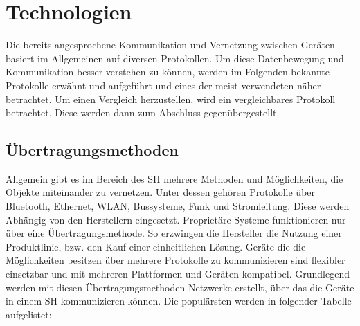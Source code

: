 \section{Technologien}
\label{sec:technologien}
    Die bereits angesprochene Kommunikation und Vernetzung zwischen Geräten basiert im Allgemeinen auf 
    diversen Protokollen. Um diese Datenbewegung und Kommunikation besser verstehen zu können, werden im 
    Folgenden bekannte Protokolle erwähnt und aufgeführt und eines der meist verwendeten näher betrachtet. 
    Um einen Vergleich herzustellen, wird ein vergleichbares Protokoll betrachtet. Diese werden dann zum 
    Abschluss gegenübergestellt. 

    \subsection{Übertragungsmethoden}
    \label{subsec:netzwerkprotokolle}
    Allgemein gibt es im Bereich des \acl{SH} mehrere Methoden und Möglichkeiten, die Objekte miteinander zu vernetzen. 
    Unter dessen gehören Protokolle über Bluetooth, Ethernet, WLAN, Bussysteme, Funk und Stromleitung. 
    Diese werden Abhängig von den Herstellern eingesetzt. Proprietäre Systeme funktionieren nur über eine 
    Übertragungsmethode. So erzwingen die Hersteller die Nutzung einer Produktlinie, bzw. den Kauf einer 
    einheitlichen Lösung. Geräte die die Möglichkeiten besitzen über mehrere Protokolle 
    zu kommunizieren sind flexibler einsetzbar und mit mehreren Plattformen und Geräten kompatibel.
    Grundlegend werden mit diesen Übertragungsmethoden Netzwerke erstellt, über das die Geräte in einem \acl{SH} kommunizieren können.
    Die populärsten werden in folgender Tabelle aufgelistet: 
